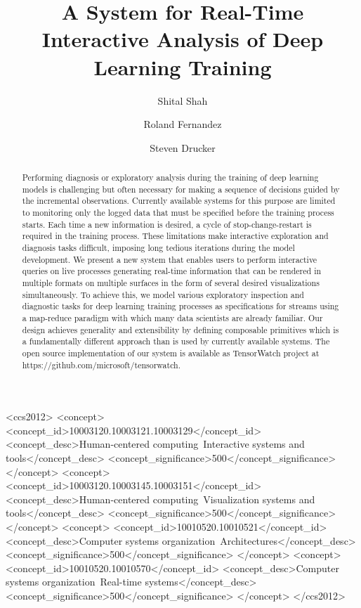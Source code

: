 \documentclass[sigchi]{acmart}
\begin{document}
\title{A System for Real-Time Interactive Analysis of Deep Learning Training}

\author{Shital Shah}

\author{Roland Fernandez}

\author{Steven Drucker}



\begin{abstract}
  Performing diagnosis or exploratory analysis during the training of deep learning models is challenging but often necessary for making a sequence of decisions guided by the incremental observations. Currently available systems for this purpose are limited to monitoring only the logged data that must be specified before the training process starts. Each time a new information is desired, a cycle of stop-change-restart is required in the training process. These limitations make interactive exploration and diagnosis tasks difficult, imposing long tedious iterations during the model development. We present a new system that enables users to perform interactive queries on live processes generating real-time information that can be rendered in multiple formats on multiple surfaces in the form of several desired visualizations simultaneously. To achieve this, we model various exploratory inspection and diagnostic tasks for deep learning training processes as specifications for streams using a map-reduce paradigm with which many data scientists are already familiar. Our design achieves generality and extensibility by defining composable primitives which is a fundamentally different approach than is used by currently available systems. The open source implementation of our system is available as TensorWatch project at https://github.com/microsoft/tensorwatch.
\end{abstract}

\begin{CCSXML}
<ccs2012>
<concept>
<concept_id>10003120.10003121.10003129</concept_id>
<concept_desc>Human-centered computing~Interactive systems and tools</concept_desc>
<concept_significance>500</concept_significance>
</concept>
<concept>
<concept_id>10003120.10003145.10003151</concept_id>
<concept_desc>Human-centered computing~Visualization systems and tools</concept_desc>
<concept_significance>500</concept_significance>
</concept>
<concept>
<concept_id>10010520.10010521</concept_id>
<concept_desc>Computer systems organization~Architectures</concept_desc>
<concept_significance>500</concept_significance>
</concept>
<concept>
<concept_id>10010520.10010570</concept_id>
<concept_desc>Computer systems organization~Real-time systems</concept_desc>
<concept_significance>500</concept_significance>
</concept>
</ccs2012>
\end{CCSXML}
\end{document}
